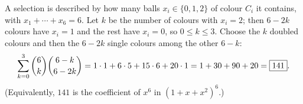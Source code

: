 A selection is described by how many balls $x_i\in\{0,1,2\}$ of colour $C_i$ it contains, with $x_1+\cdots+x_6=6$. Let $k$ be the number of colours with $x_i=2$; then $6-2k$ colours have $x_i=1$ and the rest have $x_i=0$, so $0\le k\le3$. Choose the $k$ doubled colours and then the $6-2k$ single colours among the other $6-k$:
\[
\sum_{k=0}^{3}\dbinom6k\dbinom{6-k}{6-2k}=1\cdot1+6\cdot5+15\cdot6+20\cdot1=1+30+90+20=\boxed{141}.
\]
(Equivalently, $141$ is the coefficient of $x^6$ in $\left(1+x+x^2\right)^6$.)
